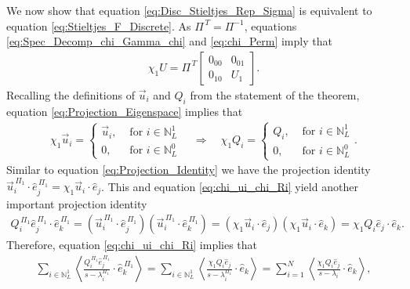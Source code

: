 \documentclass{cmslatex}
\begin{document}
We now show that equation \eqref{eq:Disc_Stieltjes_Rep_Sigma} is
equivalent to equation \eqref{eq:Stieltjes_F_Discrete}. As
$\Pi^{\,T}=\Pi^{-1}$, equations \eqref{eq:Spec_Decomp_chi_Gamma_chi} and 
\eqref{eq:chi_Perm} imply that
%
\begin{align}\label{eq:Projection_Eigenspace}
  \chi_1U=\Pi^{\,T}\left[
  \begin{array}{ccc}
    0_{00}&0_{01}\\
    0_{10}&U_1  
    \end{array}
\right].
\end{align}
%
Recalling the definitions of $\vec{u}_i$ and $Q_i$ from the
statement of the theorem, equation \eqref{eq:Projection_Eigenspace}
implies that 
%
\begin{align}\label{eq:chi_ui_chi_Ri}
  \chi_1\vec{u}_i=
  \begin{cases}
  \vec{u}_i, &\text{ for } i\in\mathbb{N}_L^1  \\
  0,        &\text{ for } i\in\mathbb{N}_L^0
  \end{cases}
  \quad \Rightarrow \quad
   \chi_1Q_i=
  \begin{cases}
  Q_i, &\text{ for } i\in\mathbb{N}_L^1  \\
  0,  &\text{ for } i\in\mathbb{N}_L^0
  \end{cases}.
\end{align}
%
Similar to equation \eqref{eq:Projection_Identity} we have the
projection identity
$\vec{u}_i^{\,\Pi_1}\cdot\hat{e}_j^{\,\Pi_1}=\chi_1\vec{u}_i\cdot\hat{e}_j$. This and
equation \eqref{eq:chi_ui_chi_Ri} yield another important projection
identity 
%
\begin{align*}
  Q_i^{\,\Pi_1}\hat{e}_j^{\,\Pi_1}\cdot\hat{e}_k^{\,\Pi_1}
  =
   (\vec{u}_i^{\,\Pi_1}\cdot\hat{e}_j^{\,\Pi_1})(\vec{u}_i^{\,\Pi_1}\cdot\hat{e}_k^{\,\Pi_1}) 
  =(\chi_1\vec{u}_i\cdot\hat{e}_j)(\chi_1\vec{u}_i\cdot\hat{e}_k)
  =\chi_1Q_i\hat{e}_j\cdot\hat{e}_k.
\end{align*}
%
Therefore, equation \eqref{eq:chi_ui_chi_Ri} implies that
%
\begin{align*}
 \sum_{i\in\mathbb{N}_L^1}\left\langle
          \frac{Q_i^{\,\Pi_1}\hat{e}_j^{\,\Pi_1}}{s-\lambda_i^{\Pi_1}}\cdot\hat{e}_k^{\,\Pi_1}
          \right\rangle 
 =
 \sum_{i\in\mathbb{N}_L^1}\left\langle
          \frac{\chi_1Q_i\hat{e}_j}{s-\lambda_i^{\Pi_1}}\cdot\hat{e}_k
          \right\rangle 
          =
 \sum_{i=1}^N\left\langle
          \frac{\chi_1Q_i\hat{e}_j}{s-\lambda_i}\cdot\hat{e}_k
          \right\rangle ,
\end{align*}
\end{document}
